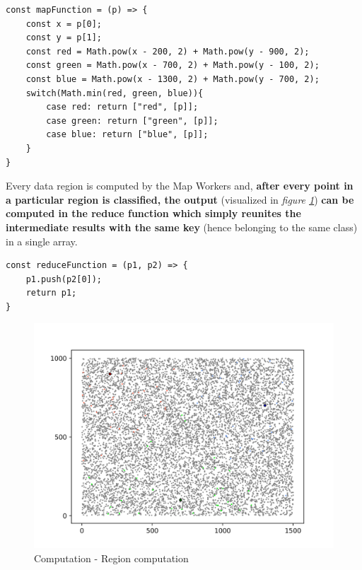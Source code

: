 \begin{lstlisting}[caption={Map function},captionpos=b]
const mapFunction = (p) => {
    const x = p[0];
    const y = p[1];
    const red = Math.pow(x - 200, 2) + Math.pow(y - 900, 2);
    const green = Math.pow(x - 700, 2) + Math.pow(y - 100, 2);
    const blue = Math.pow(x - 1300, 2) + Math.pow(y - 700, 2);
    switch(Math.min(red, green, blue)){
        case red: return ["red", [p]];
        case green: return ["green", [p]];
        case blue: return ["blue", [p]];
    }
}
\end{lstlisting}

Every data region is computed by the Map Workers and, \textbf{after every point in a particular region is classified, the output} (visualized in \textit{figure \ref{fig:computation_region_computation}}) \textbf{can be computed in the reduce function which simply reunites the intermediate results with the same key} (hence belonging to the same class) in a single array.

\begin{lstlisting}[caption={Reduce function},captionpos=b]
const reduceFunction = (p1, p2) => {
    p1.push(p2[0]);
    return p1;
}
\end{lstlisting}

\begin{figure}[!ht]
    \centering
    \includegraphics[width=\linewidth]{document/chapters/chapter_6/images/computation_region_computation.png}
    \caption{Computation - Region computation}
    \label{fig:computation_region_computation}
\end{figure}

